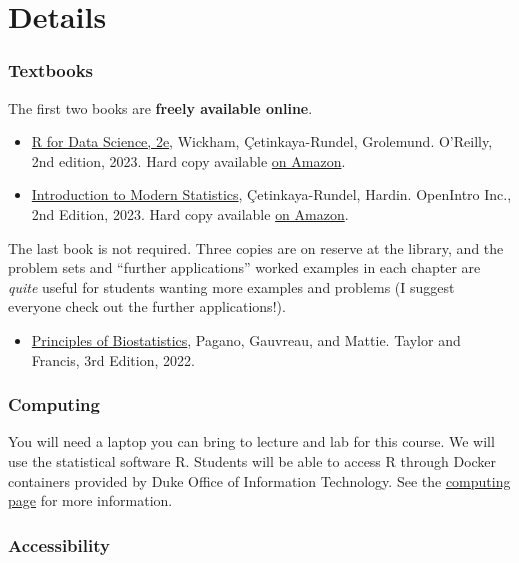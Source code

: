 \documentclass[
  letterpaper,
  DIV=11,
  numbers=noendperiod]{scrartcl}
\providecommand{\tightlist}{%
  \setlength{\itemsep}{0pt}\setlength{\parskip}{0pt}}
\begin{document}
\section{Details}\label{details}

\subsubsection{Textbooks}\label{textbooks}

The first two books are \textbf{freely available online}.

\begin{itemize}
\item
  \href{https://r4ds.hadley.nz/}{R for Data Science, 2e}, Wickham,
  Çetinkaya-Rundel, Grolemund. O'Reilly, 2nd edition, 2023. Hard copy
  available
  \href{https://www.amazon.com/dp/1492097403?&tag=hadlwick-20}{on
  Amazon}.
\item
  \href{https://openintro-ims.netlify.app/}{Introduction to Modern
  Statistics}, Çetinkaya-Rundel, Hardin. OpenIntro Inc., 2nd Edition,
  2023. Hard copy available
  \href{https://openintro.org/go?id=ims2_bw_pb&referrer=/book/ims/index.php}{on
  Amazon}.
\end{itemize}

The last book is not required. Three copies are on reserve at the
library, and the problem sets and ``further applications'' worked
examples in each chapter are \emph{quite} useful for students wanting
more examples and problems (I suggest everyone check out the further
applications!).

\begin{itemize}
\tightlist
\item
  \href{https://openintro-ims.netlify.app/}{Principles of
  Biostatistics}, Pagano, Gauvreau, and Mattie. Taylor and Francis, 3rd
  Edition, 2022.
\end{itemize}

\subsubsection{Computing}\label{computing}

You will need a laptop you can bring to lecture and lab for this course.
We will use the statistical software R. Students will be able to access
R through Docker containers provided by Duke Office of Information
Technology. See the \href{computing-access.qmd}{computing page} for more
information.

\subsubsection{Accessibility}\label{accessibility}
\end{document}
